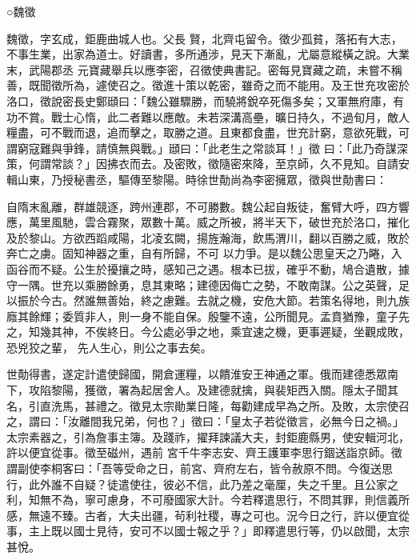 
\begin{pinyinscope}

 ○魏徵



 魏徵，字玄成，鉅鹿曲城人也。父長
 賢，北齊屯留令。徵少孤貧，落拓有大志，不事生業，出家為道士。好讀書，多所通涉，見天下漸亂，尤屬意縱橫之說。大業末，武陽郡丞
 元寶藏舉兵以應李密，召徵使典書記。密每見寶藏之疏，未嘗不稱善，既聞徵所為，遽使召之。徵進十策以乾密，雖奇之而不能用。及王世充攻密於洛口，徵說密長史鄭頲曰：「魏公雖驟勝，而驍將銳卒死傷多矣；又軍無府庫，有功不賞。戰士心惰，此二者難以應敵。未若深溝高壘，曠日持久，不過旬月，敵人糧盡，可不戰而退，追而擊之，取勝之道。且東都食盡，世充計窮，意欲死戰，可謂窮寇難與爭鋒，請慎無與戰。」頲曰：「此老生之常談耳！」徵
 曰：「此乃奇謀深策，何謂常談？」因拂衣而去。及密敗，徵隨密來降，至京師，久不見知。自請安輯山東，乃授秘書丞，驅傳至黎陽。時徐世勣尚為李密擁眾，徵與世勣書曰：



 自隋末亂離，群雄競逐，跨州連郡，不可勝數。魏公起自叛徒，奮臂大呼，四方響應，萬里風馳，雲合霧聚，眾數十萬。威之所被，將半天下，破世充於洛口，摧化及於黎山。方欲西蹈咸陽，北凌玄闕，揚旌瀚海，飲馬渭川，翻以百勝之威，敗於奔亡之虜。固知神器之重，自有所歸，不可
 以力爭。是以魏公思皇天之乃睠，入函谷而不疑。公生於擾攘之時，感知己之遇。根本已拔，確乎不動，鳩合遺散，據守一隅。世充以乘勝餘勇，息其東略；建德因侮亡之勢，不敢南謀。公之英聲，足以振於今古。然誰無善始，終之慮難。去就之機，安危大節。若策名得地，則九族廕其餘輝；委質非人，則一身不能自保。殷鑒不遠，公所聞見。孟賁猶豫，童子先之，知幾其神，不俟終日。今公處必爭之地，乘宜速之機，更事遲疑，坐觀成敗，恐兇狡之輩，
 先人生心，則公之事去矣。



 世勣得書，遂定計遣使歸國，開倉運糧，以饋淮安王神通之軍。俄而建德悉眾南下，攻陷黎陽，獲徵，署為起居舍人。及建德就擒，與裴矩西入關。隱太子聞其名，引直洗馬，甚禮之。徵見太宗勛業日隆，每勸建成早為之所。及敗，太宗使召之，謂曰：「汝離間我兄弟，何也？」徵曰：「皇太子若從徵言，必無今日之禍。」太宗素器之，引為詹事主簿。及踐祚，擢拜諫議大夫，封鉅鹿縣男，使安輯河北，許以便宜從事。徵至磁州，遇前
 宮千牛李志安、齊王護軍李思行錮送詣京師。徵謂副使李桐客曰：「吾等受命之日，前宮、齊府左右，皆令赦原不問。今復送思行，此外誰不自疑？徒遣使往，彼必不信，此乃差之毫厘，失之千里。且公家之利，知無不為，寧可慮身，不可廢國家大計。今若釋遣思行，不問其罪，則信義所感，無遠不臻。古者，大夫出疆，茍利社稷，專之可也。況今日之行，許以便宜從事，主上既以國士見待，安可不以國士報之乎？」即釋遣思行等，仍以啟聞，太宗甚悅。




\end{pinyinscope}
